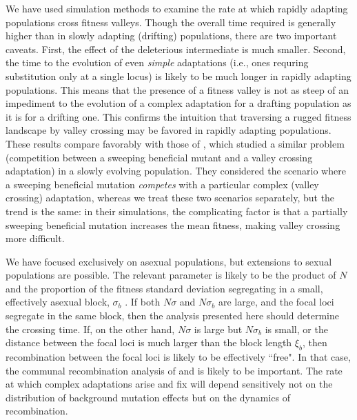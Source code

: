 \documentclass[rmp]{revtex4}
\begin{document}
We have used simulation methods to examine the rate at which rapidly adapting populations cross fitness valleys.
Though the overall time required is generally higher than in slowly adapting (drifting) populations, there are two important caveats.
First, the effect of the deleterious intermediate is much smaller.
Second, the time to the evolution of even \emph{simple} adaptations (i.e., ones requring substitution only at a single locus) is likely to be much longer in rapidly adapting populations.
This means that the presence of a fitness valley is not as steep of an impediment to the evolution of a complex adaptation for a drafting population as it is for a drifting one.
This confirms the intuition that traversing a rugged fitness landscape by valley crossing may be favored in rapidly adapting populations.
These results compare favorably with those of \citet{ochs_2015}, which studied a similar problem (competition between a sweeping beneficial mutant and a valley crossing adaptation) in a slowly evolving population.
They considered the scenario where a sweeping beneficial mutation \emph{competes} with a particular complex (valley crossing) adaptation, whereas we treat these two scenarios separately, but the trend is the same: in their simulations, the complicating factor is that a partially sweeping beneficial mutation increases the mean fitness, making valley crossing more difficult.

We have focused exclusively on asexual populations, but extensions to sexual populations are possible.
The relevant parameter is likely to be the product of $N$ and the proportion of the fitness standard deviation segregating in a small, effectively asexual block, $\sigma_b$ \citep{neher_kessinger_2013}.
If both $N\sigma$ and $N\sigma_b$ are large, and the focal loci segregate in the same block, then the analysis presented here should determine the crossing time.
If, on the other hand, $N\sigma$ is large but $N\sigma_b$ is small, or the distance between the focal loci is much larger than the block length $\xi_b$, then recombination between the focal loci is likely to be effectively ``free".
In that case, the communal recombination analysis of \citet{neher_shraiman_2011} and \citet{neher_shraiman_2010} is likely to be important.
The rate at which complex adaptations arise and fix will depend sensitively not on the distribution of background mutation effects but on the dynamics of recombination.
\end{document}
